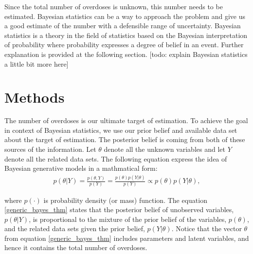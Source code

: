 \documentclass[12pt]{article}
\begin{document}
Since the total number of overdoses is unknown, this number needs to be estimated. Bayesian statistics can be a way to approach the problem and give us a good estimate of the number with a defensible range of uncertainty. Bayesian statistics is a theory in the field of statistics based on the Bayesian interpretation of probability where probability expresses a degree of belief in an event. \cite{wiki_bayes} Further explanation is provided at the following section. [todo: explain Bayesian statistics a little bit more here]\\


\section{Methods}

\normalsize 
The number of overdoses is our ultimate target of estimation. To achieve the goal in context of Bayesian statistics, we use our prior belief and available data set about the target of estimation. The posterior belief is coming from both of these sources of the information. Let $\theta$ denote all the unknown variables and let $Y$ denote all the related data sets. The following equation express the idea of Bayesian generative models in a mathmatical form:
\begin{equation}
\label{generic_bayes_thm}
\left.\begin{aligned}
p(\theta| Y ) = \frac{ p(\theta, Y)   }{ p(Y)} = \frac{ p(\theta) p(Y|\theta)}{ p(Y)} \propto p(\theta) p(Y| \theta), \end{aligned}\right.
\end{equation}

where $p(\cdot)$ is probability density (or mass) function. The equation \ref{generic_bayes_thm} states that the posterior belief of unobserved variables, $p(\theta|Y)$, is proportional to the mixture of the prior belief of the variables, $p(\theta)$, and the related data sets given the prior belief, $p(Y|\theta)$. Notice that the vector $\theta$ from equation \ref{generic_bayes_thm} includes parameters and latent variables, and hence it contains the total number of overdoses.  
\end{document}
